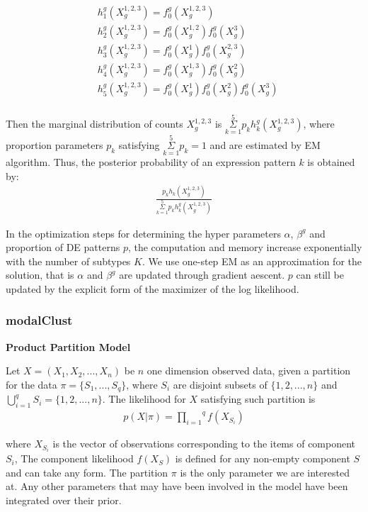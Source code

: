 \documentclass[aoas,preprint]{imsart}
\begin{document}
\begin{align*}
&h_1^{g}(X_g^{1,2,3}) = f_0^{g}(X_g^{1,2,3})\\
&h_2^{g}(X_g^{1,2,3}) = f_0^{g}(X_g^{1,2})f_0^{g}(X_g^3)\\
&h_3^{g}(X_g^{1,2,3}) = f_0^{g}(X_g^1)f_0^{g}(X_g^{2,3})\\
&h_4^{g}(X_g^{1,2,3}) = f_0^{g}(X_g^{1,3})f_0^{g}(X_g^2)\\
&h_5^{g}(X_g^{1,2,3}) = f_0^{g}(X_g^1)f_0^{g}(X_g^2)f_0^{g}(X_g^3)\\
\end{align*}


Then the marginal distribution of counts $X_g^{1,2,3}$ is $\overset{5}{\underset{k = 1}{\Sigma}} p_k h_k^{g}(X_g^{1,2,3})$, where proportion parameters $p_k$ satisfying $\overset{5}{\underset{k = 1}{\Sigma}} p_k = 1$ and are estimated by EM algorithm. Thus, the posterior probability of an expression pattern $k$ is obtained by:
\begin{eqnarray*}
\frac{p_k h_k(X_g^{1,2,3})}{\overset{5}{\underset{k = 1}{\Sigma}} p_k h_k^{g}(X_g^{1,2,3})}
\end{eqnarray*}


In the optimization steps for determining the hyper parameters $\alpha$, $\beta^g$ and proportion of DE patterns $p$, the computation and memory increase exponentially with the number of subtypes $K$. We use one-step EM as an approximation for the solution, that is $\alpha$ and $\beta^g$ are updated through gradient aescent. $p$ can still be updated by the explicit form of the maximizer of the log likelihood.


\subsubsection{modalClust}


\noindent
{\bf Product Partition Model}

Let $X = (X_1, X_2, ...,X_n)$ be $n$ one dimension observed data, given a partition for the data $\pi = \{S_1, ..., S_q\}$, where $S_i$ are disjoint subsets of $\{1,2,...,n\}$ and $\bigcup_{i = 1}^{q} S_i = \{1,2,...,n\}$. The likelihood for $X$ satisfying such partition is
\begin{eqnarray*}
p(X|\pi) = \overset{q}{\underset{i = 1}{\prod}}f(X_{S_i})
\end{eqnarray*}

where $X_{S_i}$ is the vector of observations corresponding to the items of component $S_i$, The component likelihood $f(X_{S})$ is defined for any non-empty component $S$ and can take any form. The partition $\pi$ is the only parameter we are interested at.
Any other parameters that may have been involved in the model have been integrated over their prior.
\end{document}
